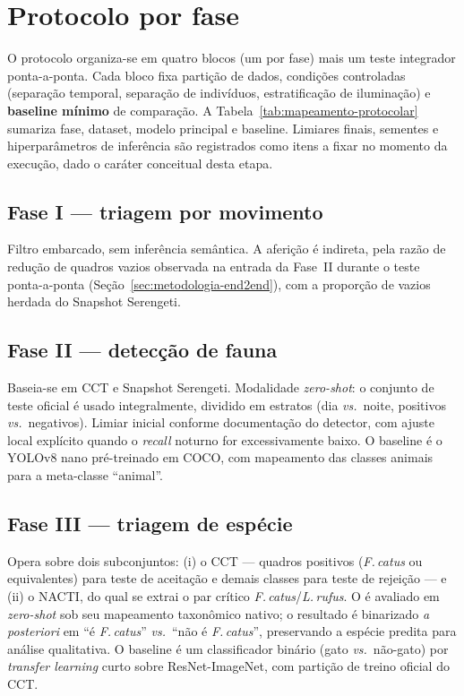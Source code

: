 \section{Protocolo por fase}
\label{sec:metodologia-protocolo}

O protocolo organiza-se em quatro blocos (um por fase) mais um teste integrador ponta-a-ponta. Cada bloco fixa partição de dados, condições controladas (separação temporal, separação de indivíduos, estratificação de iluminação) e \textbf{baseline mínimo} de comparação. A Tabela~\ref{tab:mapeamento-protocolar} sumariza fase, dataset, modelo principal e baseline. Limiares finais, sementes e hiperparâmetros de inferência são registrados como itens a fixar no momento da execução, dado o caráter conceitual desta etapa.



\subsection*{Fase I --- triagem por movimento}
Filtro embarcado, sem inferência semântica. A aferição é indireta, pela razão de redução de quadros vazios observada na entrada da Fase~II durante o teste ponta-a-ponta (Seção~\ref{sec:metodologia-end2end}), com a proporção de vazios herdada do Snapshot Serengeti.

\subsection*{Fase II --- detecção de fauna}
Baseia-se em CCT e Snapshot Serengeti. Modalidade \emph{zero-shot}: o conjunto de teste oficial é usado integralmente, dividido em estratos (dia \emph{vs.}\ noite, positivos \emph{vs.}\ negativos). Limiar inicial conforme documentação do detector, com ajuste local explícito quando o \emph{recall} noturno for excessivamente baixo. O baseline é o YOLOv8 nano pré-treinado em COCO, com mapeamento das classes animais para a meta-classe ``animal''.

\subsection*{Fase III --- triagem de espécie}
Opera sobre dois subconjuntos: (i) o CCT --- quadros positivos (\emph{F.\,catus} ou equivalentes) para teste de aceitação e demais classes para teste de rejeição --- e (ii) o NACTI, do qual se extrai o par crítico \emph{F.\,catus}/\emph{L.\,rufus}. O \modeloSN{} é avaliado em \emph{zero-shot} sob seu mapeamento taxonômico nativo; o resultado é binarizado \emph{a posteriori} em ``é \emph{F.\,catus}'' \emph{vs.}\ ``não é \emph{F.\,catus}'', preservando a espécie predita para análise qualitativa. O baseline é um classificador binário (gato \emph{vs.}\ não-gato) por \emph{transfer learning} curto sobre ResNet-ImageNet, com partição de treino oficial do CCT.

